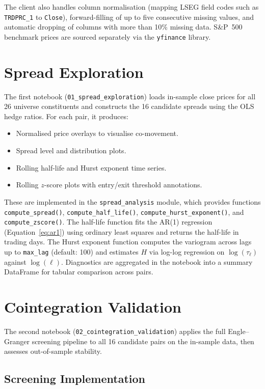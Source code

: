 \documentclass[a4paper]{report}
\begin{document}
The client also handles column normalisation (mapping LSEG field codes such as \texttt{TRDPRC\_1} to \texttt{Close}), forward-filling of up to five consecutive missing values, and automatic dropping of columns with more than 10\% missing data. S\&P~500 benchmark prices are sourced separately via the \texttt{yfinance} library.

\section{Spread Exploration}

The first notebook (\texttt{01\_spread\_exploration}) loads in-sample close prices for all 26 universe constituents and constructs the 16 candidate spreads using the OLS hedge ratios. For each pair, it produces:
\begin{itemize}
    \item Normalised price overlays to visualise co-movement.
    \item Spread level and distribution plots.
    \item Rolling half-life and Hurst exponent time series.
    \item Rolling $z$-score plots with entry/exit threshold annotations.
\end{itemize}

These are implemented in the \texttt{spread\_analysis} module, which provides functions \texttt{compute\_spread()}, \texttt{compute\_half\_life()}, \texttt{compute\_hurst\_exponent()}, and \texttt{compute\_zscore()}. The half-life function fits the AR(1) regression (Equation~\ref{eq:ar1}) using ordinary least squares and returns the half-life in trading days. The Hurst exponent function computes the variogram across lags up to \texttt{max\_lag} (default: 100) and estimates $H$ via log-log regression on $\log(\tau_\ell)$ against $\log(\ell)$. Diagnostics are aggregated in the notebook into a summary DataFrame for tabular comparison across pairs.

\section{Cointegration Validation}

The second notebook (\texttt{02\_cointegration\_validation}) applies the full Engle--Granger screening pipeline to all 16 candidate pairs on the in-sample data, then assesses out-of-sample stability.

\subsection{Screening Implementation}
\end{document}
